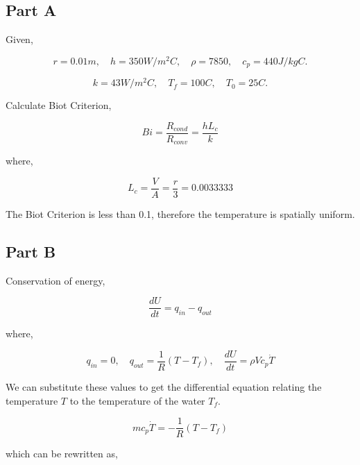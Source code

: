\documentclass[12pt]{article}
\numberwithin{equation}{subsection}
\begin{document}
  \section{}

  \subsection{Part A}

  Given,

  \[
      r = 0.01m, \quad h = 350 W/m^2C, \quad \rho = 7850, \quad c_p = 440J/kgC
    .\]

  \[
      k = 43W/m^2C, \quad T_f = 100C, \quad T_0 = 25C
    .\]

  Calculate Biot Criterion,

  \begin{equation}
    Bi = \frac{R_{cond}}{R_{conv}} = \frac{hL_c}{k}
  \end{equation}

  where,

  \begin{equation}
    L_c = \frac{V}{A} = \frac{r}{3} = 0.0033333
  \end{equation}

  The Biot Criterion is less than 0.1, therefore the temperature is spatially uniform.

  \subsection{Part B}

  Conservation of energy,

  \begin{equation}
    \frac{dU}{dt} = q_{in} - q_{out}
  \end{equation}

  where,

  \begin{equation}
    q_{in} = 0, \quad q_{out} = \frac{1}{R} (T - T_f), \quad \frac{dU}{dt} = \rho V c_p \dot T
  \end{equation}

  We can substitute these values to get the differential equation relating the temperature $ T $ to the temperature of the water $ T_f. $

  \begin{equation}
    mc_p \dot T = - \frac{1}{R} (T - T_f)
  \end{equation}

  which can be rewritten as,
\end{document}
